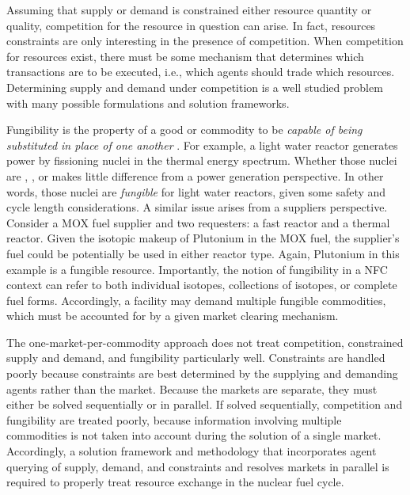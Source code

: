 Assuming that supply or demand is constrained either resource quantity or
quality, competition for the resource in question can arise. In fact, resources
constraints are only interesting in the presence of competition. When
competition for resources exist, there must be some mechanism that determines
which transactions are to be executed, i.e., which agents should trade which
resources. Determining supply and demand under competition is a well studied
problem with many possible formulations and solution frameworks.

Fungibility is the property of a good or commodity to be \textit{capable of
  being substituted in place of one another} \cite{MerriamWebster2014}. For
example, a light water reactor generates power by fissioning nuclei in the
thermal energy spectrum. Whether those nuclei are , ,
or  makes little difference from a power generation perspective. In
other words, those nuclei are \textit{fungible} for light water reactors, given
some safety and cycle length considerations. A similar issue arises from a
suppliers perspective. Consider a MOX fuel supplier and two requesters: a fast
reactor and a thermal reactor. Given the isotopic makeup of Plutonium in the MOX
fuel, the supplier's fuel could be potentially be used in either reactor
type. Again, Plutonium in this example is a fungible resource. Importantly, the
notion of fungibility in a NFC context can refer to both individual isotopes,
collections of isotopes, or complete fuel forms. Accordingly, a facility may
demand multiple fungible commodities, which must be accounted for by a given
market clearing mechanism.

The one-market-per-commodity approach does not treat competition, constrained
supply and demand, and fungibility particularly well. Constraints are handled
poorly because constraints are best determined by the supplying and demanding
agents rather than the market. Because the markets are separate, they must
either be solved sequentially or in parallel. If solved sequentially,
competition and fungibility are treated poorly, because information involving
multiple commodities is not taken into account during the solution of a single
market. Accordingly, a solution framework and methodology that incorporates
agent querying of supply, demand, and constraints and resolves markets in
parallel is required to properly treat resource exchange in the nuclear fuel
cycle.
